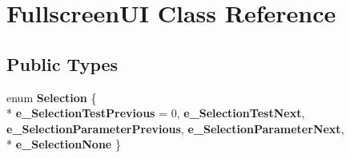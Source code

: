 \hypertarget{classFullscreenUI}{\section{Fullscreen\-U\-I Class Reference}
\label{classFullscreenUI}
}
\subsection*{Public Types}
\begin{DoxyCompactItemize}
\item 
enum {\bfseries Selection} \{ \\*
{\bfseries e\-\_\-\-Selection\-Test\-Previous} = 0, 
{\bfseries e\-\_\-\-Selection\-Test\-Next}, 
{\bfseries e\-\_\-\-Selection\-Parameter\-Previous}, 
{\bfseries e\-\_\-\-Selection\-Parameter\-Next}, 
\\*
{\bfseries e\-\_\-\-Selection\-None}
 \}
\end{DoxyCompactItemize}
